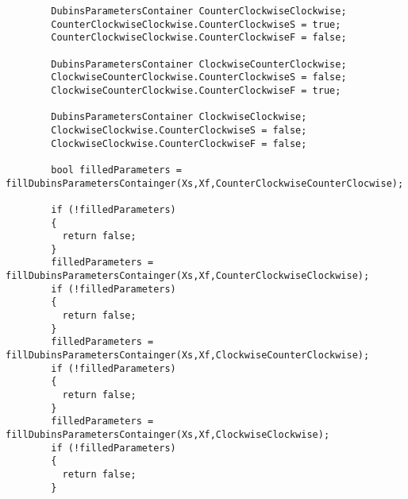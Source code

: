 \begin{frame}[fragile]
\begin{lstlisting}
        DubinsParametersContainer CounterClockwiseClockwise;
        CounterClockwiseClockwise.CounterClockwiseS = true;
        CounterClockwiseClockwise.CounterClockwiseF = false;

        DubinsParametersContainer ClockwiseCounterClockwise;
        ClockwiseCounterClockwise.CounterClockwiseS = false;
        ClockwiseCounterClockwise.CounterClockwiseF = true;

        DubinsParametersContainer ClockwiseClockwise;
        ClockwiseClockwise.CounterClockwiseS = false;
        ClockwiseClockwise.CounterClockwiseF = false;

        bool filledParameters = fillDubinsParametersContainger(Xs,Xf,CounterClockwiseCounterClocwise);

        if (!filledParameters)
        {
          return false;
        }
        filledParameters = fillDubinsParametersContainger(Xs,Xf,CounterClockwiseClockwise);
        if (!filledParameters)
        {
          return false;
        }
        filledParameters = fillDubinsParametersContainger(Xs,Xf,ClockwiseCounterClockwise);
        if (!filledParameters)
        {
          return false;
        }
        filledParameters = fillDubinsParametersContainger(Xs,Xf,ClockwiseClockwise);
        if (!filledParameters)
        {
          return false;
        }


\end{lstlisting}
\end{frame}
